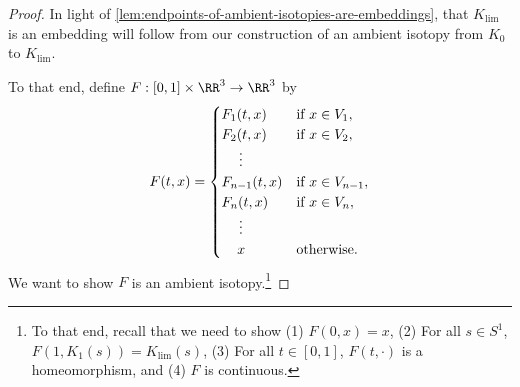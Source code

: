 \begin{proof}
  In light of
  \cref{lem:endpoints-of-ambient-isotopies-are-embeddings}, that
  $K_{\lim}$ is an embedding will follow from our construction of an
  ambient isotopy from $K_0$ to $K_{\lim}$.

  To that end, define $F : [0,1] \times \RR^3 \to \RR^3$ by
  \[
    F(t, x) =
    \begin{cases}
      F_1(t, x) & \text{if } x \in V_1, \\
      F_2(t, x) & \text{if } x \in V_2, \\
      \hspace{1.25em}\vdots & \\
      F_{n-1}(t, x) & \text{if } x \in V_{n-1}, \\
      F_{n}(t, x) & \text{if } x \in V_{n}, \\
      \hspace{1.25em}\vdots & \\
      \hspace{1.125em} x & \text{otherwise.}
    \end{cases}
  \]
  We want to show $F$ is an ambient isotopy.\footnote{To that end,
    recall that we need to show (1) $F(0, x) = x$, (2) For all $s \in
    S^1$, $F(1, K_1(s)) = K_{\lim}(s)$, (3) For all $t \in [0,1]$,
    $F(t, \cdot)$ is a homeomorphism, and (4) $F$ is continuous.}


\end{proof}
